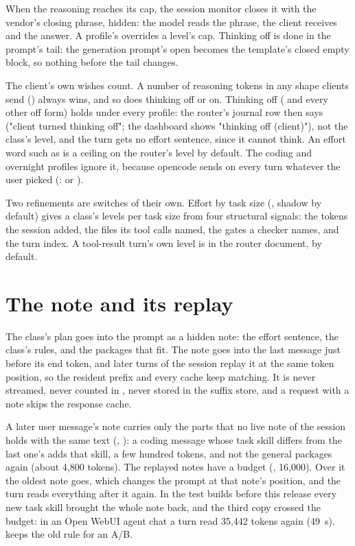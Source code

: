 When the reasoning reaches its cap, the session monitor closes it with the vendor's closing phrase, hidden: the model reads the phrase, the client receives  and the answer. A profile's  overrides a level's cap. Thinking off is done in the prompt's tail: the generation prompt's open  becomes the template's closed empty block, so nothing before the tail changes.

The client's own wishes count. A number of reasoning tokens in any shape clients send () always wins, and so does thinking off or on. Thinking off ( and every other off form) holds under every profile: the router's journal row then says  ("client turned thinking off"; the dashboard shows "thinking off (client)"), not the class's level, and the turn gets no effort sentence, since it cannot think. An effort word such as  is a ceiling on the router's level by default. The coding and overnight profiles ignore it, because opencode sends  on every turn whatever the user picked (:  or ).

Two refinements are switches of their own. Effort by task size (, shadow by default) gives a class's levels per task size from four structural signals: the tokens the session added, the files its tool calls named, the gates a checker names, and the turn index. A tool-result turn's own level is  in the router document,  by default.

\section{The note and its replay}

The class's plan goes into the prompt as a hidden note: the effort sentence, the class's rules, and the packages that fit. The note goes into the last message just before its end token, and later turns of the session replay it at the same token position, so the resident prefix and every cache keep matching. It is never streamed, never counted in , never stored in the suffix store, and a request with a note skips the response cache.

A later user message's note carries only the parts that no live note of the session holds with the same text (, ): a coding message whose task skill differs from the last one's adds that skill, a few hundred tokens, and not the general packages again (about 4,800 tokens). The replayed notes have a budget (, 16,000). Over it the oldest note goes, which changes the prompt at that note's position, and the turn reads everything after it again. In the test builds before this release every new task skill brought the whole note back, and the third copy crossed the budget: in an Open WebUI agent chat a turn read 35,442 tokens again (49~s).  keeps the old rule for an A/B.

